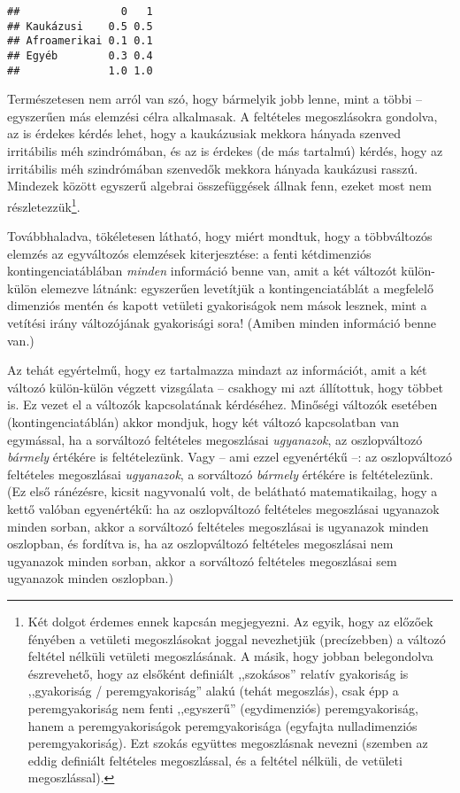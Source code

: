 \documentclass[
]{book}
\begin{document}
\begin{verbatim}
##                0   1
## Kaukázusi    0.5 0.5
## Afroamerikai 0.1 0.1
## Egyéb        0.3 0.4
##              1.0 1.0
\end{verbatim}

Természetesen nem arról van szó, hogy bármelyik jobb lenne, mint a többi -- egyszerűen más elemzési célra alkalmasak. A feltételes megoszlásokra gondolva, az is érdekes kérdés lehet, hogy a kaukázusiak mekkora hányada szenved irritábilis méh szindrómában, és az is érdekes (de más tartalmú) kérdés, hogy az irritábilis méh szindrómában szenvedők mekkora hányada kaukázusi rasszú. Mindezek között egyszerű algebrai összefüggések állnak fenn, ezeket most nem részletezzük\footnote{Két dolgot érdemes ennek kapcsán megjegyezni. Az egyik, hogy az előzőek fényében a vetületi megoszlásokat joggal nevezhetjük (precízebben) a változó feltétel nélküli vetületi megoszlásának. A másik, hogy jobban belegondolva észrevehető, hogy az elsőként definiált ,,szokásos'' relatív gyakoriság is ,,gyakoriság / peremgyakoriság'' alakú (tehát megoszlás), csak épp a peremgyakoriság nem fenti ,,egyszerű'' (egydimenziós) peremgyakoriság, hanem a peremgyakoriságok peremgyakorisága (egyfajta nulladimenziós peremgyakoriság). Ezt szokás együttes megoszlásnak nevezni (szemben az eddig definiált feltételes megoszlással, és a feltétel nélküli, de vetületi megoszlással).}.

Továbbhaladva, tökéletesen látható, hogy miért mondtuk, hogy a többváltozós elemzés az egyváltozós elemzések kiterjesztése: a fenti kétdimenziós kontingenciatáblában \emph{minden} információ benne van, amit a két változót külön-külön elemezve látnánk: egyszerűen levetítjük a kontingenciatáblát a megfelelő dimenziós mentén és kapott vetületi gyakoriságok nem mások lesznek, mint a vetítési irány változójának gyakorisági sora! (Amiben minden információ benne van.)

Az tehát egyértelmű, hogy ez tartalmazza mindazt az információt, amit a két változó külön-külön végzett vizsgálata -- csakhogy mi azt állítottuk, hogy többet is. Ez vezet el a változók kapcsolatának kérdéséhez. Minőségi változók esetében (kontingenciatáblán) akkor mondjuk, hogy két változó kapcsolatban van egymással, ha a sorváltozó feltételes megoszlásai \emph{ugyanazok}, az oszlopváltozó \emph{bármely} értékére is feltételezünk. Vagy -- ami ezzel egyenértékű --: az oszlopváltozó feltételes megoszlásai \emph{ugyanazok}, a sorváltozó \emph{bármely} értékére is feltételezünk. (Ez első ránézésre, kicsit nagyvonalú volt, de belátható matematikailag, hogy a kettő valóban egyenértékű: ha az oszlopváltozó feltételes megoszlásai ugyanazok minden sorban, akkor a sorváltozó feltételes megoszlásai is ugyanazok minden oszlopban, és fordítva is, ha az oszlopváltozó feltételes megoszlásai nem ugyanazok minden sorban, akkor a sorváltozó feltételes megoszlásai sem ugyanazok minden oszlopban.)
\end{document}
